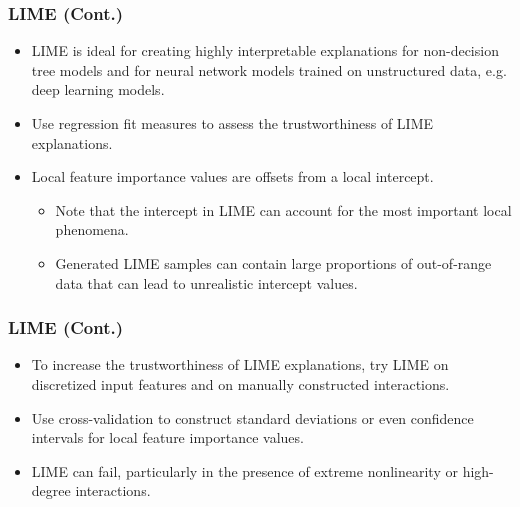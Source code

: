 \begin{frame}\frametitle{LIME (Cont.)}
	\begin{itemize}
		
		\item LIME is ideal for creating highly interpretable explanations for non-decision tree models and for neural network models trained on unstructured data, e.g. deep learning models.
		
		\item Use regression fit measures to assess the trustworthiness of LIME explanations.
		
		\item Local feature importance values are offsets from a local intercept.
		
		\begin{itemize}
			
			\item Note that the intercept in LIME can account for the most important local phenomena.
			
			\item Generated LIME samples can contain large proportions of out-of-range data that can lead to unrealistic intercept values. 
			
		\end{itemize}
		
	\end{itemize}
\end{frame}

\begin{frame}\frametitle{LIME (Cont.)}
	\begin{itemize}
		
		\item To increase the trustworthiness of LIME explanations, try LIME on discretized input features and on manually constructed interactions.
		
		\item Use cross-validation to construct standard deviations or even confidence intervals for local feature importance values.
		
		\item LIME can fail, particularly in the presence of extreme nonlinearity or high-degree interactions.
		
	\end{itemize}
\end{frame}